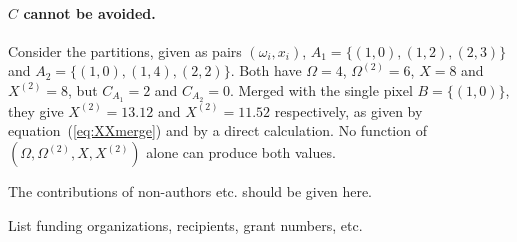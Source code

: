 \documentclass{iucrjournals}
\newcommand{\Om}{\Omega}
\newcommand{\OmS}{\Omega^{(2)}}
\newcommand{\XX}{X^{(2)}}
\begin{document}
\paragraph{$C$ cannot be avoided.}
Consider the partitions, given as pairs $(\omega_i, x_i)$, $A_1=\{(1,0),(1,2),(2,3)\}$ and $A_2=\{(1,0),(1,4),(2,2)\}$.
Both have $\Om=4$, $\OmS=6$, $X=8$ and $\XX=8$, but $C_{A_1}=2$ and $C_{A_2}=0$.
Merged with the single pixel $B=\{(1,0)\}$, they give $\XX=13.12$ and $\XX=11.52$ respectively, as given by equation~(\ref{eq:XXmerge}) and by a direct calculation.
No function of $(\Om,\OmS,X,\XX)$ alone can produce both values.

\begin{acknowledgements}
The contributions of non-authors etc. should be given here.
\end{acknowledgements}

\begin{funding}
List funding organizations, recipients, grant numbers, etc.
\end{funding}




\end{document}
